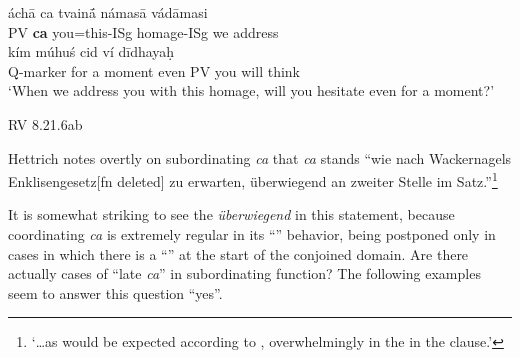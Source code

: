 \documentclass[output=paper,
modfonts
]{LSP/langsci}
\begin{document}
\begin{exe}
\ex\gll áchā ca tvainā́ námasā vádāmasi \\
		PV \textbf{ca} you=this-ISg homage-ISg {we address} \\
		
	\gll kím múhuś cid ví dīdhayaḥ \\
		Q-marker {for a moment} even PV {you will think} \\
	\glt `When we address you with this homage, will you hesitate even for a moment?'
	
	{ }\hfill {RV 8.21.6ab}
\end{exe}

\noindent Hettrich \citeyearpar[252]{hettrich1988} notes overtly  on subordinating \textit{ca} that \textit{ca} stands ``wie nach Wackernagels 
Enklisengesetz[fn deleted] zu erwarten, überwiegend an zweiter Stelle im Satz.''\footnote{`\ldots as would be expected
according to , overwhelmingly in the  in the clause.'}

It is somewhat striking to see the \textit{überwiegend} in this statement, because coordinating
\textit{ca} is extremely regular in its ``'' behavior, being postponed only in cases
in which there is a ``'' at the start of the conjoined domain. Are there actually cases
of ``late \textit{ca}'' in subordinating function? The following examples seem to answer this question
``yes''.

\end{document}
